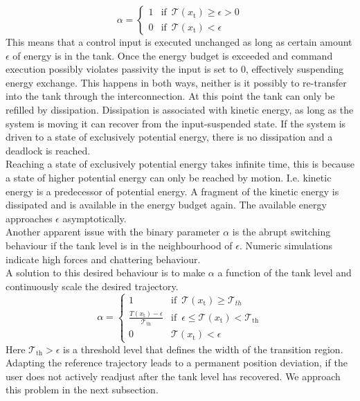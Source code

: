 \documentclass[a4paper,twoside, openright,12pt]{report}
\newcommand{\g}[1]{\text{#1}}
\begin{document}
\begin{equation}
\alpha = \begin{cases}
1 & \text{if } \, \mathcal{T}(x_\g{t})\geq\epsilon>0 \\
0 & \text{if } \, \mathcal{T}(x_\g{t}) < \epsilon
\end{cases}
\end{equation}
This means that a control input is executed unchanged as long as certain amount $\epsilon$ of energy is in the tank. Once the energy budget is exceeded and command execution possibly violates passivity the input is set to $0$, effectively suspending energy exchange. This happens in both ways, neither is it possibly to re-transfer into the tank through the interconnection. At this point the tank can only be refilled by dissipation. Dissipation is associated with kinetic energy, as long as the system is moving it can recover from the input-suspended state. If the system is driven to a state of exclusively potential energy, there is no dissipation and a deadlock is reached.\\
Reaching a state of exclusively potential energy takes infinite time, this is because a state of higher potential energy can only be reached by motion. I.e. kinetic energy is a predecessor of potential energy. A fragment of the kinetic energy is dissipated and is available in the energy budget again. The available energy approaches $\epsilon$ asymptotically.\\
Another apparent issue with the binary parameter $\alpha$ is the abrupt switching behaviour if the tank level is in the neighbourhood of $\epsilon$. Numeric simulations indicate high forces and chattering behaviour.\\
A solution to this desired behaviour is to make $\alpha$ a function of the tank level and continuously scale the desired trajectory.
\begin{equation}
\alpha = \begin{cases}
1 & \text{if } \, \mathcal{T}(x_\g{t})\geq \mathcal{T}_{th} \\
\frac{T(x_\g{t})-\epsilon}{\mathcal{T}_{\g{th}}} & \text{if } \, \epsilon \leq \mathcal{T}(x_\g{t}) < \mathcal{T}_{\g{th}} \\
0 & \mathcal{T}(x_\g{t}) < \epsilon
\end{cases}
\end{equation}
Here $\mathcal{T}_{\g{th}} > \epsilon$ is a threshold level that defines the width of the transition region. Adapting the reference trajectory leads to a permanent position deviation, if the user does not actively readjust after the tank level has recovered. We approach this problem in the next subsection.\\ 
\end{document}
